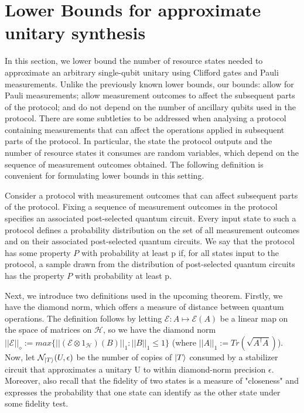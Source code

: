 \documentclass[12pt]{dalthesis}
\begin{document}
\section{Lower Bounds for approximate unitary synthesis}
In this section, we lower bound the number of resource states needed to approximate an arbitrary single-qubit unitary using Clifford gates and Pauli measurements. Unlike the previously known lower bounds, our bounds: allow for Pauli measurements; allow measurement outcomes to affect the subsequent parts of the protocol; and do not depend on the number of ancillary qubits used in the protocol.
There are some subtleties to be addressed when analysing a protocol containing measurements that can affect the operations applied in subsequent parts of the protocol. In particular, the state the protocol outputs and the number of resource states it consumes are random variables, which depend on the sequence of measurement outcomes obtained. The following definition is convenient for formulating lower bounds in this setting.

\begin{definition}
\label{propertydef}
Consider a protocol with measurement outcomes that can affect subsequent parts of the protocol. Fixing a sequence of measurement outcomes in the protocol specifies an associated post-selected quantum circuit. Every input state to such a protocol defines a probability distribution on the set of all measurement outcomes and on their associated post-selected quantum circuits. We say that the protocol has some property $P$ with probability at least p if, for all states input to the protocol, a sample drawn from the distribution of post-selected quantum circuits has the property $P$ with probability at least p.
\end{definition}

Next, we introduce two definitions used in the upcoming theorem. Firstly, we have the diamond norm, which offers a measure of distance between quantum operations. The definition follows by letting $\mathcal{E}:A \mapsto \mathcal{E}(A)$ be a linear map on the space of matrices on $\mathcal{H}$, so we have the diamond norm $||\mathcal{E}||_\diamond := max\{ ||( \mathcal{E} \otimes \mathcal{1}_\mathcal{H})(B)||_1 : ||B||_1 \leq 1 \}$ (where $||A||_1 := \textit{Tr}(\sqrt{A^\dag A})$). Now, let $\mathcal{N}_{\ket{T}}(U, \epsilon)$ be the number of copies of $\ket{T}$ consumed by a stabilizer circuit that approximates a unitary U to within diamond-norm precision $\epsilon$. Moreover, also recall that the fidelity of two states is a measure of "closeness" and expresses the probability that one state can identify as the other state under some fidelity test.
\end{document}
